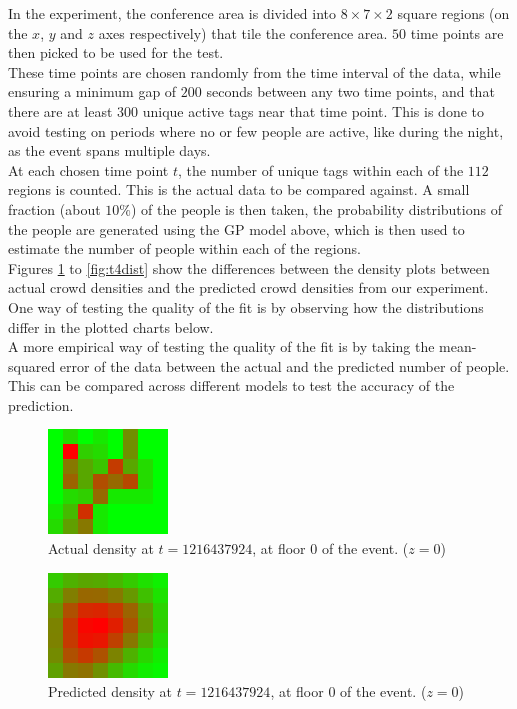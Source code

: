 \documentclass[letterpaper]{article}
\begin{document}
In the experiment, the conference area is divided into $8\times 7 \times 2$ square regions (on the $x$, $y$ and $z$ axes respectively) that tile the conference area. $50$ time points are then picked to be used for the test. \\

These time points are chosen randomly from the time interval of the data, while ensuring a minimum gap of $200$ seconds between any two time points, and that there are at least $300$ unique active tags near that time point. This is done to avoid testing on periods where no or few people are active, like during the night, as the event spans multiple days.\\

At each chosen time point $t$, the number of unique tags within each of the $112$ regions is counted. This is the actual data to be compared against. A small fraction (about $10\%$) of the people is then taken, the probability distributions of the people are generated using the GP model above, which is then used to estimate the number of people within each of the regions. \\

Figures \ref{fig:t1dist} to \ref{fig:t4dist} show the differences between the density plots between actual crowd densities and the predicted crowd densities from our experiment. One way of testing the quality of the fit is by observing how the distributions differ in the plotted charts below. \\

A more empirical way of testing the quality of the fit is by taking the mean-squared error of the data between the actual and the predicted number of people. This can be compared across different models to test the accuracy of the prediction.

\begin{figure}[h!]
  \centering
    \includegraphics[width=120px,natwidth=320,natheight=280]{selected_renders/0_1216437924.png}
  \caption{Actual density at $t=1216437924$, at floor $0$ of the event. ($z = 0$)}
  \label{fig:t1dist}
\end{figure}

\begin{figure}[h!]
  \centering
    \includegraphics[width=120px,natwidth=320,natheight=280]{selected_renders/0_1216437924p.png}
  \caption{Predicted density at $t=1216437924$, at floor $0$ of the event. ($z = 0$)}
  \label{fig:t2dist}
\end{figure}
\end{document}
